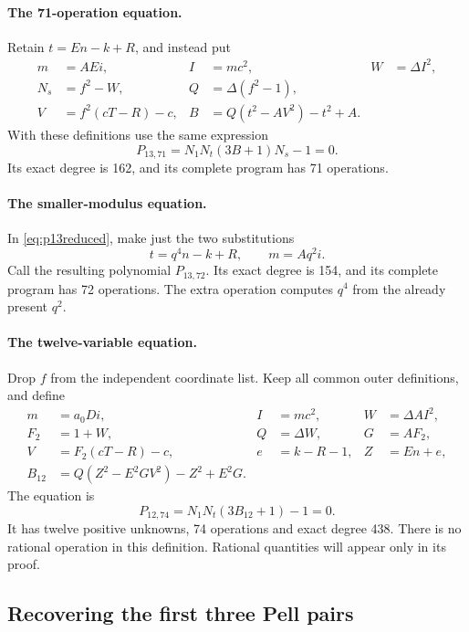\paragraph{The 71-operation equation.}
Retain $t=En-k+R$, and instead put
\begin{align*}
 m&=AEi,& I&=mc^2,& W&=\Delta I^2,\\
 N_s&=f^2-W,& Q&=\Delta(f^2-1),\\
 V&=f^2(cT-R)-c,&B&=Q(t^2-AV^2)-t^2+A.
\end{align*}
With these definitions use the same expression
\begin{equation}\label{eq:p13reduced}
 \boxed{P_{13,71}=N_1N_t(3B+1)N_s-1=0.}
\end{equation}
Its exact degree is 162, and its complete program has 71 operations.

\paragraph{The smaller-modulus equation.}
In \eqref{eq:p13reduced}, make just the two substitutions
\begin{equation}\label{eq:smallmod}
 t=q^4n-k+R,\qquad m=Aq^2i.
\end{equation}
Call the resulting polynomial $P_{13,72}$. Its exact degree is 154,
and its complete program has 72 operations. The extra operation computes
$q^4$ from the already present $q^2$.

\paragraph{The twelve-variable equation.}
Drop $f$ from the independent coordinate list. Keep all common outer
definitions, and define
\begin{align*}
 m&=a_0Di,& I&=mc^2,&W&=\Delta A I^2,\\
 F_2&=1+W,&Q&=\Delta W,&G&=AF_2,\\
 V&=F_2(cT-R)-c,&e&=k-R-1,&Z&=En+e,\\
 B_{12}&=Q(Z^2-E^2GV^2)-Z^2+E^2G.
\end{align*}
The equation is
\begin{equation}\label{eq:p12}
 \boxed{P_{12,74}=N_1N_t(3B_{12}+1)-1=0.}
\end{equation}
It has twelve positive unknowns, 74 operations and exact degree 438.
There is no rational operation in this definition. Rational quantities
will appear only in its proof.

\subsection{Recovering the first three Pell pairs}

